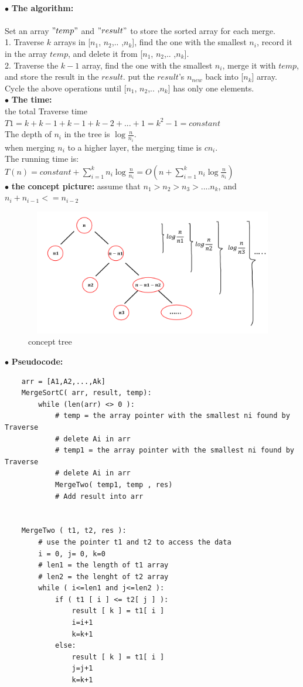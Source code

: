 \documentclass[12pt,a4paper]{article}
\newcommand{\question}[1]{\bigskip\noindent{\textbf{Q{#1} solution}}}
\begin{document}
\question{14.C}\\
$\bullet$ \textbf{The algorithm:}\\\\
Set an array $"temp"$ and $"result"$ to store the sorted array for each merge.\\
1. Traverse $k$ arrays in [$n_1$, $n_2$,.. ,$n_k$], find the one with the smallest $n_i$, record it in the array $temp$, and delete it from [$n_1$, $n_2$,.. ,$n_k$].\\
2. Traverse the $k-1$ array, find the one with the smallest $n_i$, merge it with $temp$, and store the result in the $result$. put the $result$'s $n_{new}$ back into [$n_k$] array.\\
Cycle the above operations until [$n_1$, $n_2$,.. ,$n_k$] has only one elements.\\
$\bullet$ \textbf{The time:}\\
the total Traverse time $T1 = k+k-1+k-1+k-2+...+1 = k^2-1 = constant$ \\
The depth of $n_i$ in the tree is $\log{\frac{n}{n_i}}$.\\
when merging $n_i$ to a higher layer, the merging time is $cn_i$.\\
The running time is: $T(n) = constant+ \sum^k_{i=1}{n_i\log{\frac{n}{n_i}}} = O(n+\sum^k_{i=1}{n_i\log{\frac{n}{n_i}}})$\\
$\bullet$ \textbf{the concept picture:} assume that $n_1>n_2>n_3>$....$n_k$, and $n_i+n_{i-1}<=n_{i-2}$\\
	\begin{figure}[H]
	\centering %
	\includegraphics[height=5.5cm,width=12.5cm]{picture//Q14C2.png}
	\caption{concept tree}
	\end{figure}
\noindent
$\bullet$ \textbf{Pseudocode:}
	\begin{lstlisting}
	arr = [A1,A2,...,Ak]
	MergeSortC( arr, result, temp):
		while (len(arr) <> 0 ):
			# temp = the array pointer with the smallest ni found by Traverse
			# delete Ai in arr
			# temp1 = the array pointer with the smallest ni found by Traverse
			# delete Ai in arr
			MergeTwo( temp1, temp , res)
			# Add result into arr
			

	MergeTwo ( t1, t2, res ):
		# use the pointer t1 and t2 to access the data
		i = 0, j= 0, k=0
		# len1 = the length of t1 array
		# len2 = the lenght of t2 array
		while ( i<=len1 and j<=len2 ):
			if ( t1 [ i ] <= t2[ j ] ):
				result [ k ] = t1[ i ]
				i=i+1
				k=k+1
			else:
				result [ k ] = t1[ i ]
				j=j+1
				k=k+1
	\end{lstlisting}
\end{document}
